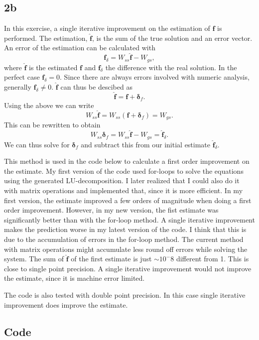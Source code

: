\subsection*{2b}
In this exercise, a single iterative improvement on the estimation of $\mathbf{f}$ is performed. The estimation, $\hat{\mathbf{f}}$, is the sum of the true solution and an error vector. An error of the estimation can be calculated with
\begin{equation}
    \mathbf{f}_\delta = W_{ss}\mathbf{\hat{f}} - W_{gs},
\end{equation}
where $\mathbf{\hat{f}}$ is the estimated $\mathbf{f}$ and $\mathbf{f}_\delta$ the difference with the real solution. In the perfect case $\mathbf{f}_\delta=0$. Since there are always errors involved with numeric analysis, generally $\mathbf{f}_\delta\neq 0$. $\hat{\mathbf{f}}$ can thus be descibed as
\begin{equation}
    \hat{\mathbf{f}} = \mathbf{f} + \mathbf{\delta}_f.
\end{equation}
Using the above we can write
\begin{equation}
    W_{ss}\hat{\mathbf{f}} = W_{ss}(\mathbf{f} + \mathbf{\delta}_f) = W_{gs}.
\end{equation}
This can be rewritten to obtain
\begin{equation}
    W_{ss}\mathbf{\delta}_f = W_{ss}\mathbf{\hat{f}} - W_{gs} = \hat{\mathbf{f}}_\delta.
\end{equation}
We can thus solve for $\mathbf{\delta}_f$ and subtract this from our initial estimate $\hat{\mathbf{f}}_\delta$.

This method is used in the code below to calculate a first order improvement on the estimate. My first version of the code used for-loops to solve the equations using the generated LU-decomposition. I later realized that I could also do it with matrix operations and implemented that, since it is more efficient. In my first version, the estimate improved a few orders of magnitude when doing a first order improvement. However, in my new version, the fist estimate was significantly better than with the for-loop method. A single iterative improvement makes the prediction worse in my latest version of the code. I think that this is due to the accumulation of errors in the for-loop method. The current method with matrix operations might accumulate less round off errors while solving the system. The sum of $\hat{\mathbf{f}}$ of the first estimate is just $\sim 10^-8$ different from 1. This is close to single point precision. A single iterative improvement would not improve the estimate, since it is machine error limited.

The code is also tested with double point precision. In this case single iterative improvement does improve the estimate.



\subsection*{Code}




\newpage
